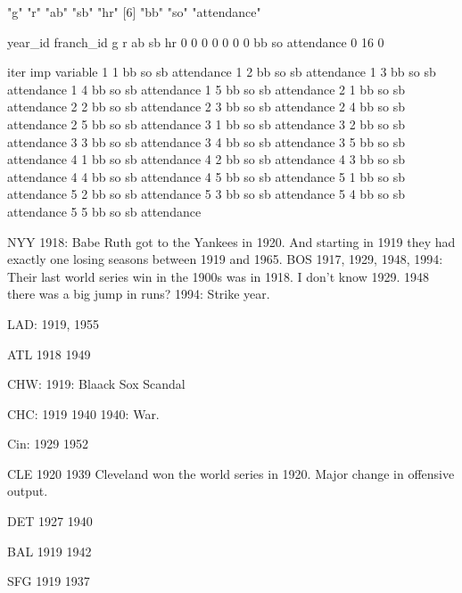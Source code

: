 \documentclass[USenglish]{article}
\theoremstyle{dgthm}
\theoremstyle{dgdef}
\begin{document}
\begin{Schunk}
\begin{Soutput}
[1] "g"          "r"          "ab"         "sb"         "hr"        
[6] "bb"         "so"         "attendance"
\end{Soutput}
\begin{Soutput}
   year_id  franch_id          g          r         ab         sb         hr 
         0          0          0          0          0          0          0 
        bb         so attendance 
         0         16          0 
\end{Soutput}
\begin{Soutput}
 iter imp variable
  1   1  bb  so  sb  attendance
  1   2  bb  so  sb  attendance
  1   3  bb  so  sb  attendance
  1   4  bb  so  sb  attendance
  1   5  bb  so  sb  attendance
  2   1  bb  so  sb  attendance
  2   2  bb  so  sb  attendance
  2   3  bb  so  sb  attendance
  2   4  bb  so  sb  attendance
  2   5  bb  so  sb  attendance
  3   1  bb  so  sb  attendance
  3   2  bb  so  sb  attendance
  3   3  bb  so  sb  attendance
  3   4  bb  so  sb  attendance
  3   5  bb  so  sb  attendance
  4   1  bb  so  sb  attendance
  4   2  bb  so  sb  attendance
  4   3  bb  so  sb  attendance
  4   4  bb  so  sb  attendance
  4   5  bb  so  sb  attendance
  5   1  bb  so  sb  attendance
  5   2  bb  so  sb  attendance
  5   3  bb  so  sb  attendance
  5   4  bb  so  sb  attendance
  5   5  bb  so  sb  attendance
\end{Soutput}
\end{Schunk}




NYY 1918: Babe Ruth got to the Yankees in 1920.  And starting in 1919 they had exactly one losing seasons between 1919 and 1965.  
BOS 1917, 1929, 1948, 1994: 
Their last world series win in the 1900s was in 1918.  
I don't know 1929. 
1948 there was a big jump in runs?  
1994: Strike year. 

LAD: 1919, 1955

ATL 1918 1949

CHW: 1919: Blaack Sox Scandal

CHC: 1919 1940
1940: War. 

Cin: 1929 1952

CLE 1920 1939
Cleveland won the world series in 1920. Major change in offensive output.  


DET 1927 1940

BAL 1919 1942

SFG 1919 1937
\end{document}
